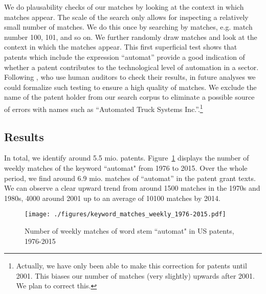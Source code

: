 \documentclass[11pt,a4paper]{article}
\begin{document}
We do plausability checks of our matches by looking at the context in which matches appear. The scale of the search only allows for inspecting a relatively small number of matches. We do this once by searching by matches, e.g. match number 100, 101, and so on. We further randomly draw matches and look at the context in which the matches appear. This first superficial test shows that patents which include the expression ``automat'' provide a good indication of whether a patent contributes to the technological level of automation in a sector. Following \cite{BBD2013}, who use human auditors to check their results, in future analyses we could formalize such testing to ensure a high quality of matches. We exclude the name of the patent holder from our search corpus to eliminate a possible source of errors with names such as ``Automated Truck Systems Inc.''.\footnote{Actually, we have only been able to make this correction for patents until 2001. This biases our number of matches (very slightly) upwards after 2001. We plan to correct this.} 

\subsection{Results}
In total, we identify around 5.5 mio. patents. Figure~\ref{fig:keyword_match_over_time} displays the number of weekly matches of the keyword ``automat" from 1976 to 2015. Over the whole period, we find around 6.9 mio. matches of ``automat'' in the patent grant texts. We can observe a clear upward trend from around 1500 matches in the 1970s and 1980s, 4000 around 2001 up to an average of 10100 matches by 2014.


\begin{figure}[tb]
\caption{Number of weekly matches of word stem ``automat" in US patents, 1976-2015}
	\centering
	\texttt{[image: ./figures/keyword\_matches\_weekly\_1976-2015.pdf]}
	\label{fig:keyword_match_over_time}
\end{figure}
\end{document}
